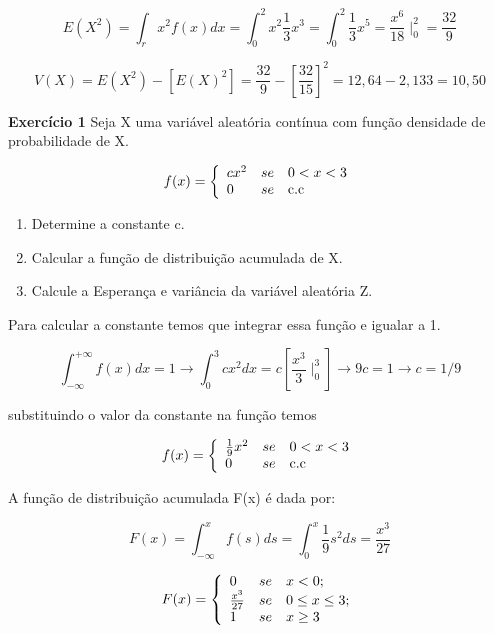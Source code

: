 $$
E(X^{2})= \int_{r} x^{2}f(x)dx = \int^{2}_{0}x^{2}\frac{1}{3}x^{3}
= \int^{2}_{0}\frac{1}{3}x^{5} = \frac{x^{6}}{18}\mid^{2}_{0}=
\frac{32}{9}
$$

$$
V(X) = E(X^{2})-[E(X)^{2}] =
\frac{32}{9}-\left[\frac{32}{15}\right]^{2} = 12,64 - 2,133 =
10,50
$$

\textbf{Exercício 1} Seja X uma variável aleatória contínua com
função densidade de probabilidade de X.


$$
f(x)=
\left\{%
\begin{array}{ll}
   cx^{2}      & se \quad \hbox{$0 < x < 3$} \\
   0           & se \quad \hbox{c.c} \\
\end{array}%
\right.
$$

\begin{enumerate}
    \item Determine a constante c.
    \item Calcular a função de distribuição acumulada de X.
    \item Calcule a Esperança e variância da variável aleatória Z.
\end{enumerate}

Para calcular a constante temos que integrar essa função e igualar
a 1.

$$
\int_{-\infty}^{+\infty}f(x)dx = 1 \rightarrow
\int_{0}^{3}cx^{2}dx = c\left[\frac{x^{3}}{3}\mid^{3}_{0}\right]
\rightarrow 9c = 1 \rightarrow c = 1/9
$$

substituindo o valor da constante na função temos

$$
f(x)=
\left\{%
\begin{array}{ll}
   \frac{1}{9}x^{2}      & se \quad \hbox{$0 < x < 3$} \\
   0           & se \quad \hbox{c.c} \\
\end{array}%
\right.
$$

A função de distribuição acumulada F(x) é dada por:

$$
F(x) = \int^{x}_{-\infty}f(s)ds = \int^{x}_{0}\frac{1}{9}s^{2}ds =
\frac{x^{3}}{27}
$$

$$
F(x)=
\left\{%
\begin{array}{ll}
    0                 & se \quad \hbox{$x < 0$;} \\
   \frac{x^{3}}{27}   & se \quad \hbox{$0 \leq x \leq 3$;} \\
   1                  & se \quad \hbox{$x \geq 3$} \\
\end{array}%
\right.
$$

